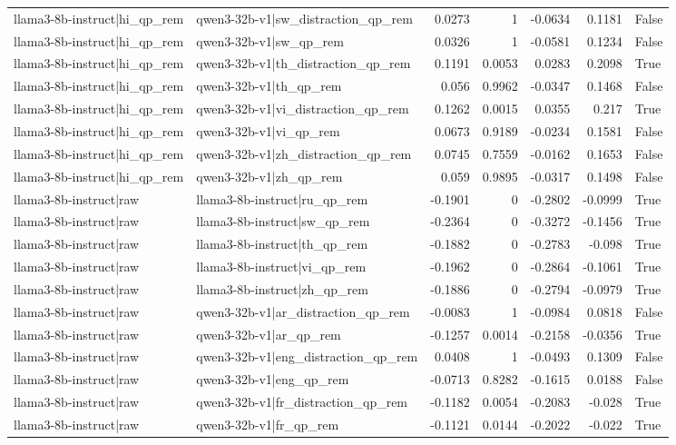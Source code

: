 \begin{table}
\begin{tabular}{l l r r r r l}
llama3-8b-instruct|hi_qp_rem & qwen3-32b-v1|sw_distraction_qp_rem & 0.0273 & 1 & -0.0634 & 0.1181 & False \\
llama3-8b-instruct|hi_qp_rem & qwen3-32b-v1|sw_qp_rem & 0.0326 & 1 & -0.0581 & 0.1234 & False \\
llama3-8b-instruct|hi_qp_rem & qwen3-32b-v1|th_distraction_qp_rem & 0.1191 & 0.0053 & 0.0283 & 0.2098 & True \\
llama3-8b-instruct|hi_qp_rem & qwen3-32b-v1|th_qp_rem & 0.056 & 0.9962 & -0.0347 & 0.1468 & False \\
llama3-8b-instruct|hi_qp_rem & qwen3-32b-v1|vi_distraction_qp_rem & 0.1262 & 0.0015 & 0.0355 & 0.217 & True \\
llama3-8b-instruct|hi_qp_rem & qwen3-32b-v1|vi_qp_rem & 0.0673 & 0.9189 & -0.0234 & 0.1581 & False \\
llama3-8b-instruct|hi_qp_rem & qwen3-32b-v1|zh_distraction_qp_rem & 0.0745 & 0.7559 & -0.0162 & 0.1653 & False \\
llama3-8b-instruct|hi_qp_rem & qwen3-32b-v1|zh_qp_rem & 0.059 & 0.9895 & -0.0317 & 0.1498 & False \\
llama3-8b-instruct|raw & llama3-8b-instruct|ru_qp_rem & -0.1901 & 0 & -0.2802 & -0.0999 & True \\
llama3-8b-instruct|raw & llama3-8b-instruct|sw_qp_rem & -0.2364 & 0 & -0.3272 & -0.1456 & True \\
llama3-8b-instruct|raw & llama3-8b-instruct|th_qp_rem & -0.1882 & 0 & -0.2783 & -0.098 & True \\
llama3-8b-instruct|raw & llama3-8b-instruct|vi_qp_rem & -0.1962 & 0 & -0.2864 & -0.1061 & True \\
llama3-8b-instruct|raw & llama3-8b-instruct|zh_qp_rem & -0.1886 & 0 & -0.2794 & -0.0979 & True \\
llama3-8b-instruct|raw & qwen3-32b-v1|ar_distraction_qp_rem & -0.0083 & 1 & -0.0984 & 0.0818 & False \\
llama3-8b-instruct|raw & qwen3-32b-v1|ar_qp_rem & -0.1257 & 0.0014 & -0.2158 & -0.0356 & True \\
llama3-8b-instruct|raw & qwen3-32b-v1|eng_distraction_qp_rem & 0.0408 & 1 & -0.0493 & 0.1309 & False \\
llama3-8b-instruct|raw & qwen3-32b-v1|eng_qp_rem & -0.0713 & 0.8282 & -0.1615 & 0.0188 & False \\
llama3-8b-instruct|raw & qwen3-32b-v1|fr_distraction_qp_rem & -0.1182 & 0.0054 & -0.2083 & -0.028 & True \\
llama3-8b-instruct|raw & qwen3-32b-v1|fr_qp_rem & -0.1121 & 0.0144 & -0.2022 & -0.022 & True \\

\end{tabular}
\end{table}
